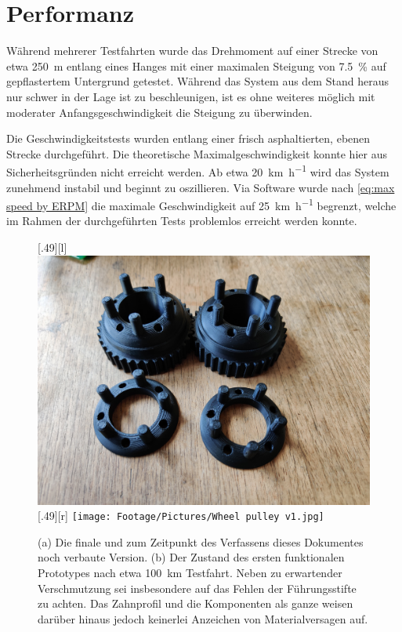 	\section{Performanz}
		Während mehrerer Testfahrten wurde das Drehmoment auf einer Strecke von etwa \qty{250}{\metre} entlang eines Hanges mit einer maximalen Steigung von \qty{7,5}{\percent} auf gepflastertem Untergrund getestet.
		Während das System aus dem Stand heraus nur schwer in der Lage ist zu beschleunigen, ist es ohne weiteres möglich mit moderater Anfangsgeschwindigkeit die Steigung zu überwinden.\par\medskip
		Die Geschwindigkeitstests wurden entlang einer frisch asphaltierten, ebenen Strecke durchgeführt.
		Die theoretische Maximalgeschwindigkeit konnte hier aus Sicherheitsgründen nicht erreicht werden.
		Ab etwa \qty{20}{\kilo\metre\per\hour} wird das System zunehmend instabil und beginnt zu oszillieren.
		Via Software wurde nach \cref{eq:max speed by ERPM} die maximale Geschwindigkeit auf \qty{25}{\kilo\metre\per\hour} begrenzt, welche im Rahmen der durchgeführten Tests problemlos erreicht werden konnte.
		\begin{figure}[h]
			\centering
			[.49\textwidth][l]{
				\includegraphics[angle=180, width=.49\textwidth]{Footage/Pictures/Wheel pulley v2.jpg}
			}
			[.49\textwidth][r]{
				\texttt{[image: Footage/Pictures/Wheel pulley v1.jpg]}
			}
			\caption[Vergleich der gedruckten Zahn- und Konterscheiben vor und nach mehreren Testfahrten]{(a) Die finale und zum Zeitpunkt des Verfassens dieses Dokumentes noch verbaute Version. (b) Der Zustand des ersten funktionalen Prototypes nach etwa \qty{100}{\kilo\metre} Testfahrt. Neben zu erwartender Verschmutzung sei insbesondere auf das Fehlen der Führungsstifte zu achten. Das Zahnprofil und die Komponenten als ganze weisen darüber hinaus jedoch keinerlei Anzeichen von Materialversagen auf.}
			\label{fig:comparison printed parts used unused}
		\end{figure}